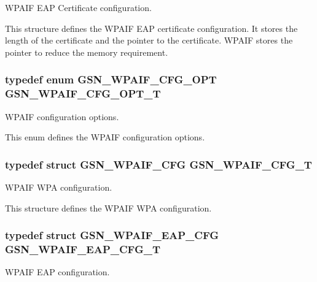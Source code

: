 WPAIF EAP Certificate configuration. 

This structure defines the WPAIF EAP certificate configuration. It stores the length of the certificate and the pointer to the certificate. WPAIF stores the pointer to reduce the memory requirement. \hypertarget{a00687_ga40c2baeb843f878b19724138a045f065}{
\subsubsection[{GSN\_\-WPAIF\_\-CFG\_\-OPT\_\-T}]{\setlength{\rightskip}{0pt plus 5cm}typedef enum {\bf GSN\_\-WPAIF\_\-CFG\_\-OPT} {\bf GSN\_\-WPAIF\_\-CFG\_\-OPT\_\-T}}}
\label{a00687_ga40c2baeb843f878b19724138a045f065}


WPAIF configuration options. 

This enum defines the WPAIF configuration options. \hypertarget{a00687_ga7cc823d929ee57574f3590cd8af66f18}{
\subsubsection[{GSN\_\-WPAIF\_\-CFG\_\-T}]{\setlength{\rightskip}{0pt plus 5cm}typedef struct {\bf GSN\_\-WPAIF\_\-CFG} {\bf GSN\_\-WPAIF\_\-CFG\_\-T}}}
\label{a00687_ga7cc823d929ee57574f3590cd8af66f18}


WPAIF WPA configuration. 

This structure defines the WPAIF WPA configuration. \hypertarget{a00687_gaca9adbc88af0681a3cfbc31eb772a548}{
\subsubsection[{GSN\_\-WPAIF\_\-EAP\_\-CFG\_\-T}]{\setlength{\rightskip}{0pt plus 5cm}typedef struct {\bf GSN\_\-WPAIF\_\-EAP\_\-CFG}  {\bf GSN\_\-WPAIF\_\-EAP\_\-CFG\_\-T}}}
\label{a00687_gaca9adbc88af0681a3cfbc31eb772a548}


WPAIF EAP configuration. 

